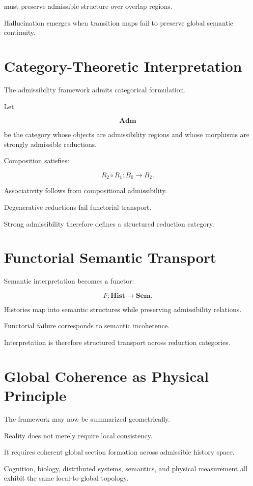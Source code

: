 \documentclass[12pt,openany]{book}
\theoremstyle{plain}
\theoremstyle{definition}
\theoremstyle{remark}
\begin{document}
must preserve admissible structure over overlap regions.

Hallucination emerges when transition maps fail to preserve
global semantic continuity.

\section{Category-Theoretic Interpretation}

The admissibility framework admits categorical formulation.

Let

\[
\mathbf{Adm}
\]

be the category whose objects are admissibility regions and whose
morphisms are strongly admissible reductions.

Composition satisfies:

\[
R_2\circ R_1
:
B_0\to B_2.
\]

Associativity follows from compositional admissibility.

Degenerative reductions fail functorial transport.

Strong admissibility therefore defines a structured reduction
category.

\section{Functorial Semantic Transport}

Semantic interpretation becomes a functor:

\[
F :
\mathbf{Hist}
\to
\mathbf{Sem}.
\]

Histories map into semantic structures while preserving
admissibility relations.

Functorial failure corresponds to semantic incoherence.

Interpretation is therefore structured transport across reduction
categories.

\section{Global Coherence as Physical Principle}

The framework may now be summarized geometrically.

Reality does not merely require local consistency.

It requires coherent global section formation across admissible
history space.

Cognition, biology, distributed systems, semantics, and physical
measurement all exhibit the same local-to-global topology.
\end{document}
